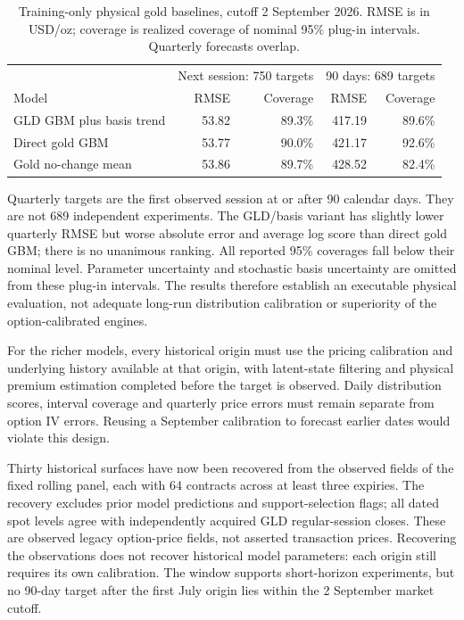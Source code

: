 \begin{table}[H]
\centering\small
\caption{Training-only physical gold baselines, cutoff 2 September 2026.
RMSE is in USD/oz; coverage is realized coverage of nominal 95\% plug-in
intervals. Quarterly forecasts overlap.}
\label{tab:physical-gold-baseline}
\begin{tabularx}{\textwidth}{@{}Xrrrr@{}}
\toprule
 & \multicolumn{2}{c}{Next session: 750 targets}
 & \multicolumn{2}{c}{90 days: 689 targets}\\
Model & RMSE & Coverage & RMSE & Coverage\\
\midrule
GLD GBM plus basis trend & 53.82 & 89.3\% & 417.19 & 89.6\%\\
Direct gold GBM & 53.77 & 90.0\% & 421.17 & 92.6\%\\
Gold no-change mean & 53.86 & 89.7\% & 428.52 & 82.4\%\\
\bottomrule
\end{tabularx}
\end{table}

Quarterly targets are the first observed session at or after 90 calendar
days. They are not 689 independent experiments. The GLD/basis variant has
slightly lower quarterly RMSE but worse absolute error and average log score
than direct gold GBM; there is no unanimous ranking. All reported 95\%
coverages fall below their nominal level. Parameter uncertainty and stochastic
basis uncertainty are omitted from these plug-in intervals. The results
therefore establish an executable physical evaluation, not adequate long-run
distribution calibration or superiority of the option-calibrated engines.

For the richer models, every historical origin must use the pricing
calibration and underlying history available at that origin, with latent-state
filtering and physical premium estimation completed before the target is
observed. Daily distribution scores, interval coverage and quarterly price
errors must remain separate from option IV errors. Reusing a September
calibration to forecast earlier dates would violate this design.

Thirty historical surfaces have now been recovered from the observed fields
of the fixed rolling panel, each with 64 contracts across at least three
expiries. The recovery excludes prior model predictions and support-selection
flags; all dated spot levels agree with independently acquired GLD regular-session
closes. These are observed legacy option-price fields, not asserted transaction
prices. Recovering the observations does not recover historical model parameters:
each origin still requires its own calibration. The window supports short-horizon
experiments, but no 90-day target after the first July origin lies within the
2 September market cutoff.

